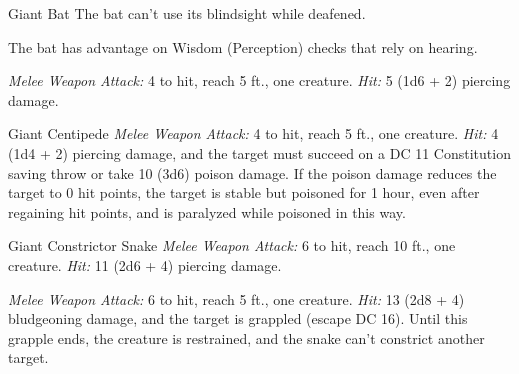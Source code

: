 \documentclass[10pt,a4paper,twoside,bg=print,twocolumn,openany,nodeprecatedcode]{dndbook}
\begin{document}
\begin{DndMonster}[float=t]{Giant Bat}
\DndMonsterBasics[
armor-class = {13},
hit-points = {\DndDice{4d10}},
speed = {10 ft., fly 60 ft.}
]
\DndMonsterAbilityScores[
 str = 15,
 dex = 16,
 con = 11,
 int = 2,
 wis = 12,
 cha = 6
]
\DndMonsterDetails[
senses = {blindsight 60 ft., passive perception 11},
challenge = 1/4,
]
The bat can't use its blindsight while deafened.

The bat has advantage on Wisdom (Perception) checks that rely on hearing.

\textsl{Melee Weapon Attack:} 4 to hit, reach 5 ft., one creature. \textsl{Hit:} 5 (1d6 + 2) piercing damage.

\end{DndMonster}



\begin{DndMonster}[float=t]{Giant Centipede}
\DndMonsterBasics[
armor-class = {13 (natural armor)},
hit-points = {\DndDice{1d6 + 1}},
speed = {30 ft., climb 30 ft.}
]
\DndMonsterAbilityScores[
 str = 5,
 dex = 14,
 con = 12,
 int = 1,
 wis = 7,
 cha = 3
]
\DndMonsterDetails[
senses = {blindsight 30 ft., passive perception 8},
challenge = 1/4,
]
\textsl{Melee Weapon Attack:} 4 to hit, reach 5 ft., one creature. \textsl{Hit:} 4 (1d4 + 2) piercing damage, and the target must succeed on a DC 11 Constitution saving throw or take 10 (3d6) poison damage. If the poison damage reduces the target to 0 hit points, the target is stable but poisoned for 1 hour, even after regaining hit points, and is paralyzed while poisoned in this way.

\end{DndMonster}



\begin{DndMonster}[float=t]{Giant Constrictor Snake}
\DndMonsterBasics[
armor-class = {12},
hit-points = {\DndDice{8d12 + 8}},
speed = {30 ft., swim 30 ft.}
]
\DndMonsterAbilityScores[
 str = 19,
 dex = 14,
 con = 12,
 int = 1,
 wis = 10,
 cha = 3
]
\DndMonsterDetails[
skills = {Perception +2},
senses = {blindsight 10 ft., passive perception 12},
challenge = 2,
]
\textsl{Melee Weapon Attack:} 6 to hit, reach 10 ft., one creature. \textsl{Hit:} 11 (2d6 + 4) piercing damage.

\textsl{Melee Weapon Attack:} 6 to hit, reach 5 ft., one creature. \textsl{Hit:} 13 (2d8 + 4) bludgeoning damage, and the target is grappled (escape DC 16). Until this grapple ends, the creature is restrained, and the snake can't constrict another target.

\end{DndMonster}
\end{document}
